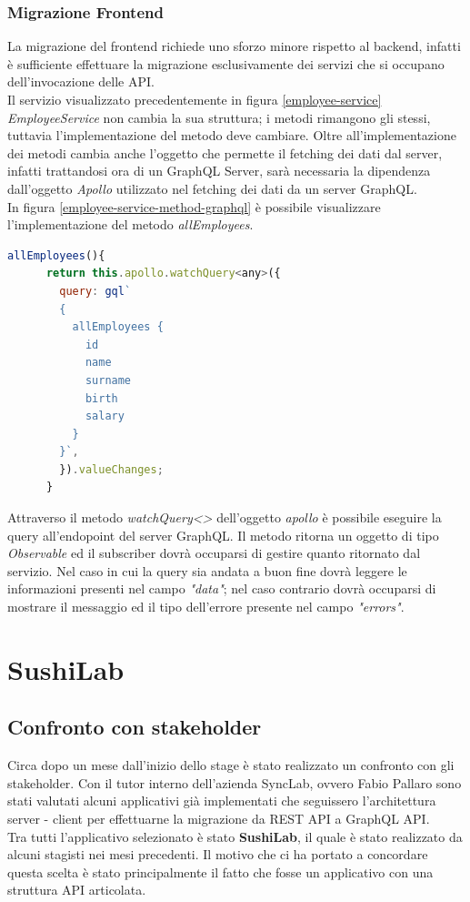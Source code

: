 \subsubsection*{Migrazione Frontend}
La migrazione del frontend richiede uno sforzo minore rispetto al backend, infatti è sufficiente effettuare la migrazione esclusivamente dei servizi che si occupano dell'invocazione delle API.\\
Il servizio visualizzato precedentemente in figura \ref{employee-service} \textit{EmployeeService} non cambia la sua struttura; i metodi rimangono gli stessi, tuttavia l'implementazione del metodo deve cambiare. Oltre all'implementazione dei metodi cambia anche l'oggetto che permette il fetching dei dati dal server, infatti trattandosi ora di un GraphQL Server, sarà necessaria la dipendenza dall'oggetto \textit{Apollo} utilizzato nel fetching dei dati da un server GraphQL.\\
In figura \ref{employee-service-method-graphql} è possibile visualizzare l'implementazione del metodo  \textit{allEmployees}.
\begin{lstlisting}[language=JavaScript]
  allEmployees(){
      return this.apollo.watchQuery<any>({
        query: gql`
        {
          allEmployees {
            id
            name
            surname
            birth
            salary
          }
        }`,
        }).valueChanges;
      }
\end{lstlisting}
Attraverso il metodo \textit{watchQuery<>} dell'oggetto \textit{apollo} è possibile eseguire la query all'endopoint del server GraphQL. Il metodo ritorna un oggetto di tipo \textit{Observable} ed il subscriber dovrà occuparsi di gestire quanto ritornato dal servizio. Nel caso in cui la query sia andata a buon fine dovrà leggere le informazioni presenti nel campo \textit{"data"}; nel caso contrario dovrà occuparsi di mostrare il messaggio ed il tipo dell'errore presente nel campo \textit{"errors"}.
\section{SushiLab}
\label{sushi-lab}
\subsection{Confronto con stakeholder}
Circa dopo un mese dall'inizio dello stage è stato realizzato un confronto con gli stakeholder. Con il tutor interno dell'azienda SyncLab, ovvero Fabio Pallaro sono stati valutati alcuni applicativi già implementati che seguissero l'architettura server - client per effettuarne la migrazione da REST API a GraphQL API.\\
Tra tutti l'applicativo selezionato è stato \textbf{SushiLab}, il quale è stato realizzato da alcuni stagisti nei mesi precedenti. Il motivo che ci ha portato a concordare questa scelta è stato principalmente il fatto che fosse un applicativo con una struttura API articolata.
